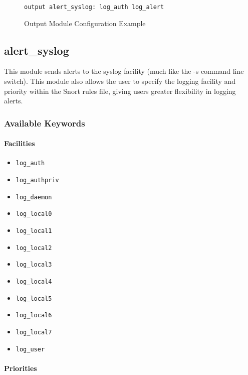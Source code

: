 \documentclass[english]{report}
\begin{document}
\begin{figure}[!hbpt]
\begin{verbatim}
output alert_syslog: log_auth log_alert
\end{verbatim}

\caption{\label{output config example}Output Module Configuration Example}
\end{figure}

\subsection{alert\_syslog \label{alert syslog lable}}

This module sends alerts to the syslog facility (much like the -s
command line switch). This module also allows the user to specify
the logging facility and priority within the Snort rules file, giving
users greater flexibility in logging alerts.

\subsubsection{Available Keywords}


\paragraph{Facilities}

\begin{itemize}
\item \texttt{log\_auth} 
\item \texttt{log\_authpriv} 
\item \texttt{log\_daemon}
\item \texttt{log\_local0} 
\item \texttt{log\_local1}
\item \texttt{log\_local2}
\item \texttt{log\_local3}
\item \texttt{log\_local4}
\item \texttt{log\_local5}
\item \texttt{log\_local6}
\item \texttt{log\_local7}
\item \texttt{log\_user}
\end{itemize}

\paragraph{Priorities}
\end{document}
